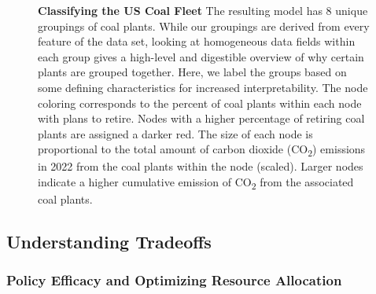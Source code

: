 
\begin{figure}[H]
    
    \caption{\textbf{Classifying the US Coal Fleet} The resulting model has 8 unique groupings of coal plants. 
    While our groupings are derived from every feature of the data set, looking at homogeneous data fields within 
    each group gives a high-level and digestible overview of why certain plants are grouped together. Here, we label 
    the groups based on some defining characteristics for increased interpretability.
    The node coloring corresponds to the percent of coal plants within each node with plans to retire. 
    Nodes with a higher percentage of retiring coal plants are assigned a darker red. The size of each node is 
    proportional to the total amount of carbon dioxide (CO\textsubscript{2}) emissions in 2022 from the coal plants within the node (scaled). 
    Larger nodes indicate a higher cumulative emission of CO\textsubscript{2} from the associated coal plants.}
    \label{fig:coal-fleet-partition}
\end{figure}

\subsection{Understanding Tradeoffs}

\subsubsection{Policy Efficacy and Optimizing Resource Allocation}
